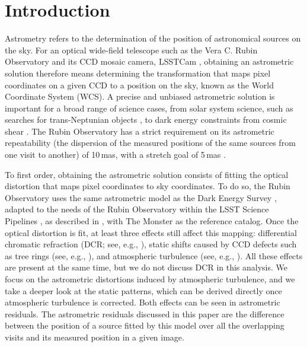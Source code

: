 \section{Introduction}
\label{intro}

Astrometry refers to the determination of the position of astronomical sources on the sky.
For an optical wide-field telescope such as the Vera C. Rubin Observatory \citep{2019ApJ...873..111I} and 
its CCD mosaic camera, LSSTCam \citep{10.71929/rubin/2571927}, obtaining an astrometric solution therefore 
means determining the transformation that maps pixel coordinates on a given CCD to a position on the sky, 
known as the World Coordinate System (WCS).
A precise and unbiased astrometric solution is important for a broad range of science cases, from solar system science, 
such as searches for trans-Neptunian objects \citep[TNOs;][]{2020ApJS..247...32B}, to dark energy constraints from 
cosmic shear \citep{2021A&A...650A..81L}.
The Rubin Observatory has a strict requirement on its astrometric repeatability 
(the dispersion of the measured positions of the same sources from one visit to another) of 10\,mas, 
with a stretch goal of 5\,mas \citep{LPM-17}.

To first order, obtaining the astrometric solution consists of fitting the optical distortion that maps pixel coordinates to sky coordinates.
To do so, the Rubin Observatory uses the same astrometric model as the Dark Energy Survey \citep[DES;][hereafter B17]{2017PASP..129g4503B}, 
adapted to the needs of the Rubin Observatory within the LSST Science Pipelines \citep{PSTN-019}, as described in 
\citet[hereafter S24]{DMTN-266}, with The Monster \citep{DMTN-277} as the reference catalog.
Once the optical distortion is fit, at least three effects still affect this mapping: differential chromatic refraction 
(DCR; see, e.g., \citealt{2012PASP..124.1113A}), static shifts caused by CCD defects such as tree rings 
(see, e.g., \citealt{2014JInst...9C4001P, 2014PASP..126..750P, 2017JInst..12C5015P}), and atmospheric turbulence (see, e.g., ).
All these effects are present at the same time, but we do not discuss DCR in this analysis.
We focus on the astrometric distortions induced by atmospheric turbulence, and we take a deeper look at the static patterns, 
which can be derived directly once atmospheric turbulence is corrected. Both effects can be seen in astrometric residuals. 
The astrometric residuals discussed in this paper are the difference between the position of a source fitted by this model 
over all the overlapping visits and its measured position in a given image.

